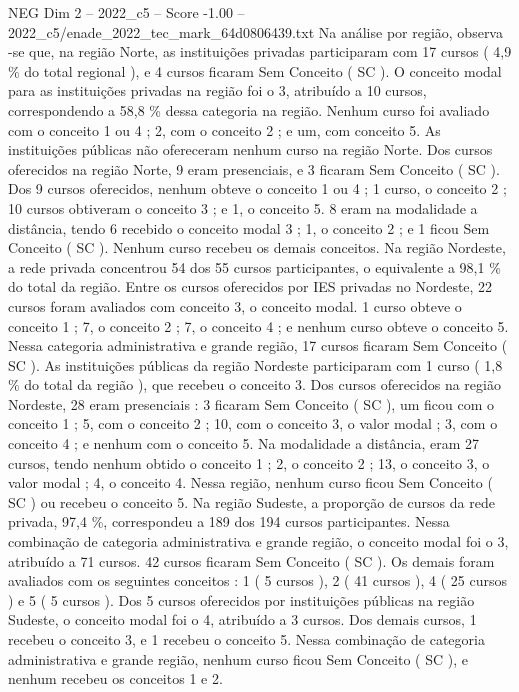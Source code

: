 \begin{textsample}{NEG Dim 2 – 2022\_c5 – Score -1.00 – 2022\_c5/enade\_2022\_tec\_mark\_64d0806439.txt}
Na análise por região, observa -se que, na região Norte, as instituições privadas participaram com 17 cursos ( 4,9 \% do total regional ), e 4 cursos ficaram Sem Conceito ( SC ).
O conceito modal para as instituições privadas na região foi o 3, atribuído a 10 cursos, correspondendo a 58,8 \% dessa categoria na região.
Nenhum curso foi avaliado com o conceito 1 ou 4 ; 2, com o conceito 2 ; e um, com conceito 5.
As instituições públicas não ofereceram nenhum curso na região Norte.
Dos cursos oferecidos na região Norte, 9 eram presenciais, e 3 ficaram Sem Conceito ( SC ).
Dos 9 cursos oferecidos, nenhum obteve o conceito 1 ou 4 ; 1 curso, o conceito 2 ; 10 cursos obtiveram o conceito 3 ; e 1, o conceito 5. 8 eram na modalidade a distância, tendo 6 recebido o conceito modal 3 ; 1, o conceito 2 ; e 1 ficou Sem Conceito ( SC ).
Nenhum curso recebeu os demais conceitos.
Na região Nordeste, a rede privada concentrou 54 dos 55 cursos participantes, o equivalente a 98,1 \% do total da região.
Entre os cursos oferecidos por IES privadas no Nordeste, 22 cursos foram avaliados com conceito 3, o conceito modal. 1 curso obteve o conceito 1 ; 7, o conceito 2 ; 7, o conceito 4 ; e nenhum curso obteve o conceito 5.
Nessa categoria administrativa e grande região, 17 cursos ficaram Sem Conceito ( SC ).
As instituições públicas da região Nordeste participaram com 1 curso ( 1,8 \% do total da região ), que recebeu o conceito 3.
Dos cursos oferecidos na região Nordeste, 28 eram presenciais : 3 ficaram Sem Conceito ( SC ), um ficou com o conceito 1 ; 5, com o conceito 2 ; 10, com o conceito 3, o valor modal ; 3, com o conceito 4 ; e nenhum com o conceito 5.
Na modalidade a distância, eram 27 cursos, tendo nenhum obtido o conceito 1 ; 2, o conceito 2 ; 13, o conceito 3, o valor modal ; 4, o conceito 4.
Nessa região, nenhum curso ficou Sem Conceito ( SC ) ou recebeu o conceito 5.
Na região Sudeste, a proporção de cursos da rede privada, 97,4 \%, correspondeu a 189 dos 194 cursos participantes.
Nessa combinação de categoria administrativa e grande região, o conceito modal foi o 3, atribuído a 71 cursos. 42 cursos ficaram Sem Conceito ( SC ).
Os demais foram avaliados com os seguintes conceitos : 1 ( 5 cursos ), 2 ( 41 cursos ), 4 ( 25 cursos ) e 5 ( 5 cursos ).
Dos 5 cursos oferecidos por instituições públicas na região Sudeste, o conceito modal foi o 4, atribuído a 3 cursos.
Dos demais cursos, 1 recebeu o conceito 3, e 1 recebeu o conceito 5.
Nessa combinação de categoria administrativa e grande região, nenhum curso ficou Sem Conceito ( SC ), e nenhum recebeu os conceitos 1 e 2.

\end{textsample}
